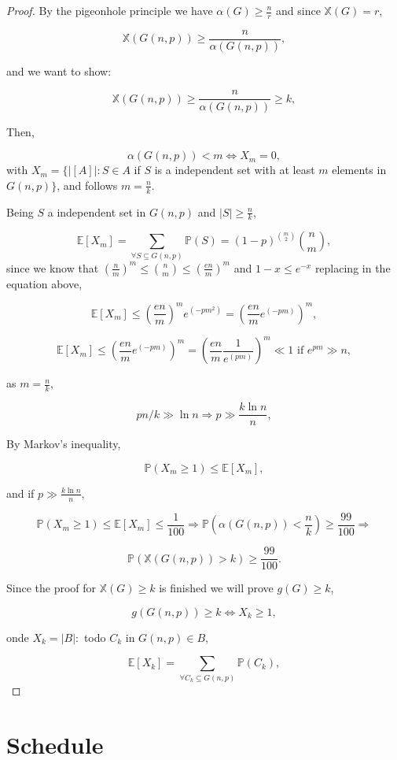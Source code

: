 \documentclass[12pt,twoside,a4paper]{book}
\numberwithin{equation}{section}
\let\subset\subseteq
\let\log=\ln
\theoremstyle{remark}
\begin{document}
\begin{proof}
By the pigeonhole principle we have $\alpha (G) \geq \frac{n}{r}$ and since $\mathbb{X}(G)=r$,

$$\mathbb{X}(G(n,p)) \geq \frac{n}{\alpha(G(n,p))},$$

and we want to show:

$$\mathbb{X}(G(n,p)) \geq \frac{n}{\alpha(G(n,p))} \geq k ,$$

Then,

$$\alpha(G(n,p)) < m \iff X_m=0 ,$$
with $X_m = \{|[A]|: S \in A$ if $S$ is a independent set with at least $m$ elements in $G(n,p)\}$,
and follows $m = \frac{n}{k}$. 

Being $S$ a independent set in $G(n,p)$ and $|S| \geq \frac{n}{k}$,

$$\mathbb{E}[X_m]=\sum_{\forall S\subset G(n,p)} \mathbb{P}(S) =(1-p)^{\binom{m}{2}} \binom{n}{m},$$
since we know that $\left(\frac{n}{m}\right)^m \leq \binom{n}{m} \leq \left(\frac{en}{m}\right)^m$ and $1-x \leq e^{-x}$ replacing in the equation above,

$$\mathbb{E}[X_m] \leq \left(\frac{en}{m}\right)^m  e^{(-pm^2)} = \left(\frac{en}{m} e^{(-pm)}\right)^m,$$

$$\mathbb{E}[X_m] \leq \left(\frac{en}{m} e^{(-pm)}\right)^m = \left(\frac{en}{m}\frac{1}{e^{(pm)}}\right)^m  \ll 1 \text{ if } e^{pm} \gg n ,$$ 

as $m =\frac{n}{k}$,

$$ pn/k \gg \log n \Rightarrow p \gg \frac{k\log n}{n},$$
 
 By Markov's inequality,
 
 $$ \mathbb{P}(X_m \geq 1) \leq \mathbb{E}[X_m] ,$$
 
and if $p \gg \frac{k \log n}{n},$
 
 $$ \mathbb{P}(X_m \geq 1) \leq \mathbb{E}[X_m] \leq \frac{1}{100}  \Rightarrow \mathbb{P}(\alpha (G(n,p)) < \frac{n}{k}) \geq \frac{99}{100} \Rightarrow $$

$$\mathbb{P}(\mathbb{X}(G(n,p)) > k) \geq \frac{99}{100}.$$


Since the proof for $\mathbb{X}(G) \geq k$ is finished we will prove $g(G)\geq k$,

$$ g(G(n,p)) \geq k \iff X_k \geq 1,$$


onde $X_k = |B|: $ todo $ C_k$ in $G(n,p) \in B$,

$$\mathbb{E}[X_k] = \sum_{\forall C_k \subset G(n,p)} \mathbb{P}(C_k),$$

\end{proof}

\chapter{Schedule}
\end{document}
